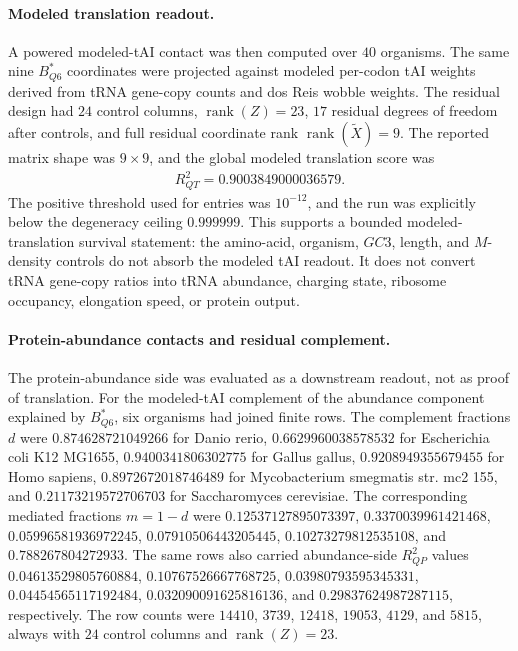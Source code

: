 \paragraph{Modeled translation readout.}
A powered modeled-tAI contact was then computed over $40$ organisms.  The same nine $B^*_{Q6}$ coordinates were projected against modeled per-codon tAI weights derived from tRNA gene-copy counts and dos Reis wobble weights.  The residual design had $24$ control columns, $\operatorname{rank}(Z)=23$, $17$ residual degrees of freedom after controls, and full residual coordinate rank $\operatorname{rank}(\widetilde X)=9$.  The reported matrix shape was $9\times 9$, and the global modeled translation score was
$$
\begin{aligned}
R^2_{QT}=0.9003849000036579.
\end{aligned}
$$
The positive threshold used for entries was $10^{-12}$, and the run was explicitly below the degeneracy ceiling $0.999999$.  This supports a bounded modeled-translation survival statement: the amino-acid, organism, $GC3$, length, and $M$-density controls do not absorb the modeled tAI readout.  It does not convert tRNA gene-copy ratios into tRNA abundance, charging state, ribosome occupancy, elongation speed, or protein output.

\paragraph{Protein-abundance contacts and residual complement.}
The protein-abundance side was evaluated as a downstream readout, not as proof of translation.  For the modeled-tAI complement of the abundance component explained by $B^*_{Q6}$, six organisms had joined finite rows.  The complement fractions $d$ were $0.874628721049266$ for Danio rerio, $0.6629960038578532$ for Escherichia coli K12 MG1655, $0.9400341806302775$ for Gallus gallus, $0.9208949355679455$ for Homo sapiens, $0.8972672018746489$ for Mycobacterium smegmatis str. mc2 155, and $0.21173219572706703$ for Saccharomyces cerevisiae.  The corresponding mediated fractions $m=1-d$ were $0.12537127895073397$, $0.3370039961421468$, $0.05996581936972245$, $0.07910506443205445$, $0.10273279812535108$, and $0.788267804272933$.  The same rows also carried abundance-side $R^2_{QP}$ values $0.04613529805760884$, $0.10767526667768725$, $0.03980793595345331$, $0.04454565117192484$, $0.032090091625816136$, and $0.29837624987287115$, respectively.  The row counts were $14410$, $3739$, $12418$, $19053$, $4129$, and $5815$, always with $24$ control columns and $\operatorname{rank}(Z)=23$.

